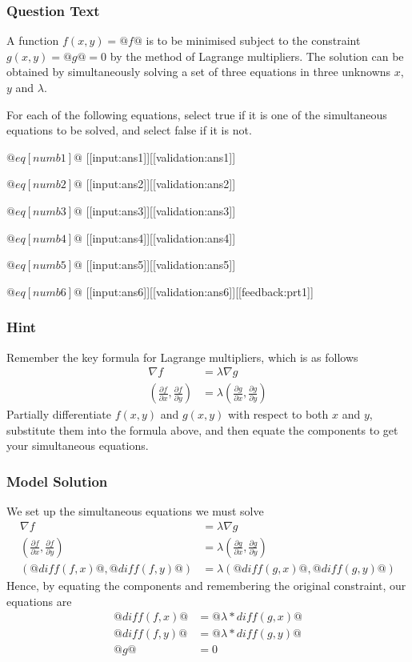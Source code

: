 \documentclass[a4paper,10pt]{article}
\begin{document}
\subsubsection{Question Text}
A function $f(x,y) = @f@$ is to be minimised subject to the constraint $g(x,y) = @g@ = 0$ by the method of Lagrange multipliers. The solution can be obtained by simultaneously solving a set of three equations in three unknowns $x$, $y$ and $\lambda$.

For each of the following equations, select true if it is one of the simultaneous equations to be solved, and select false if it is not.

\( @eq[numb1]@ \)   [[input:ans1]][[validation:ans1]]

\( @eq[numb2]@ \)   [[input:ans2]][[validation:ans2]]

\( @eq[numb3]@ \)   [[input:ans3]][[validation:ans3]]

\( @eq[numb4]@ \)   [[input:ans4]][[validation:ans4]]

\( @eq[numb5]@ \)   [[input:ans5]][[validation:ans5]]

\( @eq[numb6]@ \)   [[input:ans6]][[validation:ans6]][[feedback:prt1]]
\subsubsection{Hint}
Remember the key formula for Lagrange multipliers, which is as follows \begin{align*} \nabla f &= \lambda \nabla g \\ \left(\frac{\partial f}{\partial x},\frac{\partial f}{\partial y} \right) &= \lambda \left( \frac{\partial g}{\partial x}, \frac{\partial g}{\partial y} \right) \end{align*} Partially differentiate $f(x,y)$ and $g(x,y)$ with respect to both $x$ and $y$, substitute them into the formula above, and then equate the components to get your simultaneous equations.
\subsubsection{Model Solution}
We set up the simultaneous equations we must solve \begin{align*} \nabla f &= \lambda \nabla g \\ \left( \frac{\partial f}{\partial x},  \frac{\partial f}{\partial y} \right) &= \lambda \left( \frac{\partial g}{\partial x},  \frac{\partial g}{\partial y} \right) \\ \left( @diff(f,x)@,  @diff(f,y)@ \right) &= \lambda \left( @diff(g,x)@,  @diff(g,y)@ \right) \end{align*} Hence, by equating the components and remembering the original constraint, our equations are \begin{align*} @diff(f,x)@ &= @\lambda * diff(g,x)@ \\ @diff(f,y)@ &= @\lambda * diff(g,y)@ \\ @g@ &= 0 \end{align*}
\end{document}
